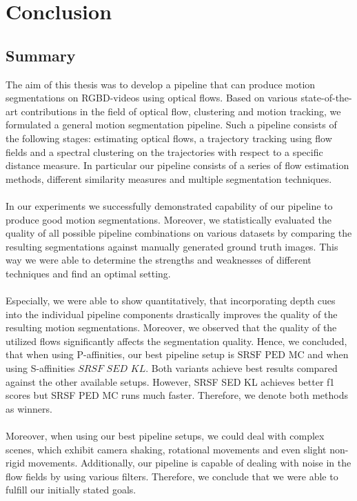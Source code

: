 \chapter{Conclusion}
\section{Summary}
The aim of this thesis was to develop a pipeline that can produce motion segmentations on RGBD-videos using optical flows. Based on various state-of-the-art contributions in the field of optical flow, clustering and motion tracking, we formulated a general motion segmentation pipeline. Such a pipeline consists of the following stages: estimating optical flows, a trajectory tracking using flow fields and a spectral clustering on the trajectories with respect to a specific distance measure. In particular our pipeline consists of a series of flow estimation methods, different similarity measures and multiple segmentation techniques. \\ \\ 
In our experiments we successfully demonstrated capability of our pipeline to produce good motion segmentations. Moreover, we statistically evaluated the quality of all possible pipeline combinations on various datasets by comparing the resulting segmentations against manually generated ground truth images. This way we were able to determine the strengths and weaknesses of different techniques and find an optimal setting. \\ \\
Especially, we were able to show quantitatively, that incorporating depth cues into the individual pipeline components drastically improves the quality of the resulting motion segmentations. Moreover, we observed that the quality of the utilized flows significantly affects the segmentation quality. Hence, we concluded, that when using P-affinities, our best pipeline setup is $\text{SRSF PED MC}$ and when using S-affinities $\textit{SRSF SED KL}$. Both variants achieve best results compared against the other available setups. However, SRSF SED KL achieves better f1 scores but SRSF PED MC runs much faster. Therefore, we denote both methods as winners.  \\ \\
Moreover, when using our best pipeline setups, we could deal with complex scenes, which exhibit camera shaking, rotational movements and even slight non-rigid movements. Additionally, our pipeline is capable of dealing with noise in the flow fields by using various filters. Therefore, we conclude that we were able to fulfill our initially stated goals. \\ \\

